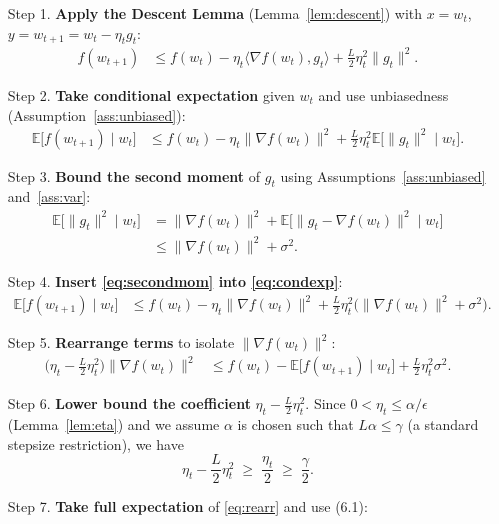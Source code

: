 \documentclass[11pt]{article}
\newcommand{\E}{\mathbb{E}}
\begin{document}
\begin{enumerate}
\item[Step 1.] \textbf{Apply the Descent Lemma} (Lemma~\ref{lem:descent}) with $x=w_t$, $y=w_{t+1}=w_t-\eta_t g_t$:
\begin{align}
    f(w_{t+1})
    &\le f(w_t)-\eta_t\langle\nabla f(w_t),g_t\rangle
          +\frac{L}{2}\eta_t^{2}\|g_t\|^{2}.
    \label{eq:descent}
\end{align}
\item[Step 2.] \textbf{Take conditional expectation} given $w_t$ and use unbiasedness (Assumption~\ref{ass:unbiased}):
\begin{align}
    \E\!\big[f(w_{t+1})\mid w_t\big]
    &\le f(w_t)-\eta_t\|\nabla f(w_t)\|^{2}
      +\frac{L}{2}\eta_t^{2}\E\!\big[\|g_t\|^{2}\mid w_t\big].
    \label{eq:condexp}
\end{align}
\item[Step 3.] \textbf{Bound the second moment} of $g_t$ using Assumptions~\ref{ass:unbiased} and~\ref{ass:var}:
\begin{align}
    \E\!\big[\|g_t\|^{2}\mid w_t\big]
    &= \|\nabla f(w_t)\|^{2}
       +\E\!\big[\|g_t-\nabla f(w_t)\|^{2}\mid w_t\big] \nonumber\\
    &\le \|\nabla f(w_t)\|^{2}+\sigma^{2}.
    \label{eq:secondmom}
\end{align}
\item[Step 4.] \textbf{Insert \eqref{eq:secondmom} into \eqref{eq:condexp}}:
\begin{align}
    \E\!\big[f(w_{t+1})\mid w_t\big]
    &\le f(w_t)-\eta_t\|\nabla f(w_t)\|^{2}
      +\frac{L}{2}\eta_t^{2}\big(\|\nabla f(w_t)\|^{2}+\sigma^{2}\big).
    \label{eq:mid}
\end{align}
\item[Step 5.] \textbf{Rearrange terms} to isolate $\|\nabla f(w_t)\|^{2}$:
\begin{align}
    \big(\eta_t-\tfrac{L}{2}\eta_t^{2}\big)\|\nabla f(w_t)\|^{2}
    &\le f(w_t)-\E\!\big[f(w_{t+1})\mid w_t\big]
      +\frac{L}{2}\eta_t^{2}\sigma^{2}.
    \label{eq:rearr}
\end{align}
\item[Step 6.] \textbf{Lower bound the coefficient} $\eta_t-\frac{L}{2}\eta_t^{2}$.
Since $0<\eta_t\le\alpha/\epsilon$ (Lemma~\ref{lem:eta}) and we assume $\alpha$ is chosen such that $L\alpha\le\gamma$ (a standard stepsize restriction), we have
\[
\eta_t-\frac{L}{2}\eta_t^{2}\;\ge\;\frac{\eta_t}{2}\;\ge\;\frac{\gamma}{2}.
\tag{6.1}
\]
\item[Step 7.] \textbf{Take full expectation} of \eqref{eq:rearr} and use (6.1):

\end{enumerate}
\end{document}
